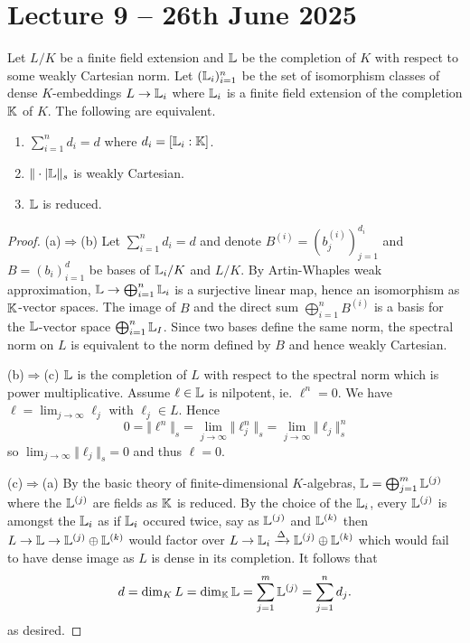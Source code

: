 \section{Lecture 9 -- 26th June 2025}\label{sec: lecture 9}
\begin{proposition}\label{prop: equivalent conditions on dense embeddings}
    Let $L/K$ be a finite field extension and $\mathbb{L}$ be the completion of $K$ with respect to some weakly Cartesian norm. Let $(\mathbb{L}_{i})_{i=1}^{n}$ be the set of isomorphism classes of dense $K$-embeddings $L\to\mathbb{L}_{i}$ where $\mathbb{L}_{i}$ is a finite field extension of the completion $\mathbb{K}$ of $K$. The following are equivalent. 
    \begin{enumerate}[label=(\alph*)]
        \item $\sum_{i=1}^{n}d_{i}=d$ where $d_{i}=[\mathbb{L}_{i}:\mathbb{K}]$. 
        \item $\Vert\cdot|\mathbb{L}\Vert_{s}$ is weakly Cartesian. 
        \item $\mathbb{L}$ is reduced. 
    \end{enumerate}
\end{proposition}
\begin{proof}
    (a)$\Rightarrow$(b) Let $\sum_{i=1}^{n}d_{i}=d$ and denote $B^{(i)}=(b_{j}^{(i)})_{j=1}^{d_{i}}$ and $B=(b_{i})_{i=1}^{d}$ be bases of $\mathbb{L}_{i}/K$ and $L/K$. By Artin-Whaples weak approximation, $\mathbb{L}\to\bigoplus_{i=1}^{n}\mathbb{L}_{i}$ is a surjective linear map, hence an isomorphism as $\mathbb{K}$-vector spaces. The image of $B$ and the direct sum $\bigoplus_{i=1}^{n}B^{(i)}$ is a basis for the $\mathbb{L}$-vector space $\bigoplus_{i=1}^{n}\mathbb{L}_{I}$. Since two bases define the same norm, the spectral norm on $L$ is equivalent to the norm defined by $B$ and hence weakly Cartesian. 

    (b)$\Rightarrow$(c) $\mathbb{L}$ is the completion of $L$ with respect to the spectral norm which is power multiplicative. Assume $\ell\in\mathbb{L}$ is nilpotent, ie. $\ell^{n}=0$. We have $\ell=\lim_{j\to\infty}\ell_{j}$ with $\ell_{j}\in L$. Hence 
    $$0=\Vert\ell^{n}\Vert_{s}=\lim_{j\to\infty}\Vert \ell_{j}^{n}\Vert_{s} =\lim_{j\to\infty}\Vert\ell_{j}\Vert_{s}^{n}$$
    so $\lim_{j\to\infty}\Vert\ell_{j}\Vert_{s}=0$ and thus $\ell=0$. 

    (c)$\Rightarrow$(a) By the basic theory of finite-dimensional $K$-algebras, $\mathbb{L}=\bigoplus_{j=1}^{m}\mathbb{L}^{(j)}$ where the $\mathbb{L}^{(j)}$ are fields as $\mathbb{K}$ is reduced. By the choice of the $\mathbb{L}_{i}$, every $\mathbb{L}^{(j)}$ is amongst the $\mathbb{L}_{i}$ as if $\mathbb{L}_{i}$ occured twice, say as $\mathbb{L}^{(j)}$ and $\mathbb{L}^{(k)}$ then $L\to\mathbb{L}\to\mathbb{L}^{(j)}\oplus\mathbb{L}^{(k)}$ would factor over $L\to\mathbb{L}_{i}\xrightarrow{\Delta}\mathbb{L}^{(j)}\oplus\mathbb{L}^{(k)}$ which would fail to have dense image as $L$ is dense in its completion. It follows that 
    $$d=\dim_{K}L=\dim_{\mathbb{K}}\mathbb{L}=\sum_{j=1}^{m}\mathbb{L}^{(j)}=\sum_{j=1}^{n}d_{j}.$$
    as desired. 
\end{proof}
